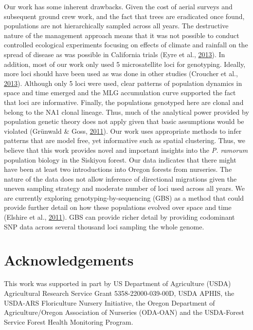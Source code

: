 \documentclass[double,11pt]{beavtex}
\begin{document}
  Our work has some inherent drawbacks. Given the cost of aerial surveys
  and subsequent ground crew work, and the fact that trees are eradicated
  once found, populations are not hierarchically sampled across all years.
  The destructive nature of the management approach means that it was not
  possible to conduct controlled ecological experiments focusing on
  effects of climate and rainfall on the spread of disease as was possible
  in California trials (Eyre et al.,
  \protect\hyperlink{ref-eyre2013poulation}{2013}). In addition, most of
  our work only used 5 microsatellite loci for genotyping. Ideally, more
  loci should have been used as was done in other studies (Croucher et
  al., \protect\hyperlink{ref-croucher2013combining}{2013}). Although only
  5 loci were used, clear patterns of population dynamics in space and
  time emerged and the MLG accumulation curve supported the fact that loci
  are informative. Finally, the populations genotyped here are clonal and
  belong to the NA1 clonal lineage. Thus, much of the analytical power
  provided by population genetic theory does not apply given that basic
  assumptions would be violated (Grünwald \& Goss,
  \protect\hyperlink{ref-grunwald2011evolution}{2011}). Our work uses
  appropriate methods to infer patterns that are model free, yet
  informative such as spatial clustering. Thus, we believe that this work
  provides novel and important insights into the \emph{P. ramorum}
  population biology in the Siskiyou forest. Our data indicates that there
  might have been at least two introductions into Oregon forests from
  nurseries. The nature of the data does not allow inference of
  directional migrations given the uneven sampling strategy and moderate
  number of loci used across all years. We are currently exploring
  genotyping-by-sequencing (GBS) as a method that could provide further
  detail on how these populations evolved over space and time (Elshire et
  al., \protect\hyperlink{ref-elshire2011robust}{2011}). GBS can provide
  richer detail by providing codominant SNP data across several thousand
  loci sampling the whole genome.
  
  \section{Acknowledgements}\label{acknowledgements-2}
  
  This work was supported in part by US Department of Agriculture (USDA)
  Agricultural Research Service Grant 5358-22000-039-00D, USDA APHIS, the
  USDA-ARS Floriculture Nursery Initiative, the Oregon Department of
  Agriculture/Oregon Association of Nurseries (ODA-OAN) and the
  USDA-Forest Service Forest Health Monitoring Program.
  
\end{document}
